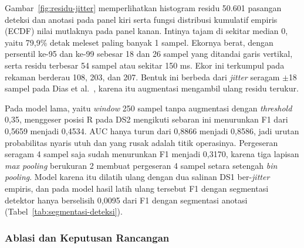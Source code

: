 Gambar~\ref{fig:residu-jitter} memperlihatkan histogram residu 50.601 pasangan deteksi dan anotasi pada panel kiri serta fungsi distribusi kumulatif empiris (ECDF) nilai mutlaknya pada panel kanan. Intinya tajam di sekitar median 0, yaitu 79,9\% detak meleset paling banyak 1 sampel. Ekornya berat, dengan persentil ke-95 dan ke-99 sebesar 18 dan 26 sampel yang ditandai garis vertikal, serta residu terbesar 54 sampel atau sekitar 150 ms. Ekor ini terkumpul pada rekaman berderau 108, 203, dan 207. Bentuk ini berbeda dari \textit{jitter} seragam $\pm$18 sampel pada Dias et al.~\cite{dias_2021}, karena itu augmentasi mengambil ulang residu terukur.

Pada model lama, yaitu \textit{window} 250 sampel tanpa augmentasi dengan \textit{threshold} 0,35, menggeser posisi R pada DS2 mengikuti sebaran ini menurunkan F1 dari 0,5659 menjadi 0,4534. AUC hanya turun dari 0,8866 menjadi 0,8586, jadi urutan probabilitas nyaris utuh dan yang rusak adalah titik operasinya. Pergeseran seragam 4 sampel saja sudah menurunkan F1 menjadi 0,3170, karena tiga lapisan \textit{max pooling} berukuran 2 membuat pergeseran 4 sampel setara setengah \textit{bin pooling}. Model karena itu dilatih ulang dengan dua salinan DS1 ber-\textit{jitter} empiris, dan pada model hasil latih ulang tersebut F1 dengan segmentasi detektor hanya berselisih 0,0095 dari F1 dengan segmentasi anotasi (Tabel~\ref{tab:segmentasi-deteksi}).


\subsubsection{Ablasi dan Keputusan Rancangan}

